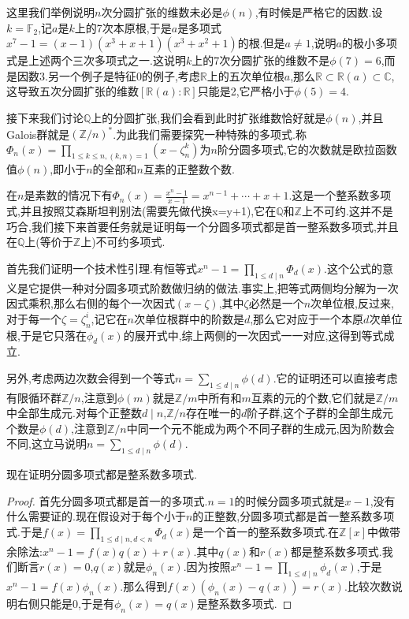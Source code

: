 这里我们举例说明$n$次分圆扩张的维数未必是$\phi(n)$,有时候是严格它的因数.设$k=\mathbb{F}_2$,记$a$是$k$上的7次本原根,于是$a$是多项式$x^7-1=(x-1)(x^3+x+1)(x^3+x^2+1)$的根.但是$a\not=1$,说明$a$的极小多项式是上述两个三次多项式之一.这说明$k$上的7次分圆扩张的维数不是$\phi(7)=6$,而是因数3.另一个例子是特征0的例子,考虑$\mathbb{R}$上的五次单位根$a$,那么$\mathbb{R}\subset\mathbb{R}(a)\subset\mathbb{C}$,这导致五次分圆扩张的维数$[\mathbb{R}(a):\mathbb{R}]$只能是2,它严格小于$\phi(5)=4$.

接下来我们讨论$\mathbb{Q}$上的分圆扩张,我们会看到此时扩张维数恰好就是$\phi(n)$,并且Galois群就是$(\mathbb{Z}/n)^*$.为此我们需要探究一种特殊的多项式.称$\Phi_n(x)=\prod_{1\le k\le n,(k,n)=1}(x-\zeta_n^k)$为$n$阶分圆多项式,它的次数就是欧拉函数值$\phi(n)$,即小于$n$的全部和$n$互素的正整数个数.

在$n$是素数的情况下有$\Phi_n(x)=\frac{x^n-1}{x-1}=x^{n-1}+\cdots+x+1$.这是一个整系数多项式,并且按照艾森斯坦判别法(需要先做代换x=y+1),它在$\mathbb{Q}$和$\mathbb{Z}$上不可约.这并不是巧合,我们接下来首要任务就是证明每一个分圆多项式都是首一整系数多项式,并且在$\mathbb{Q}$上(等价于$\mathbb{Z}$上)不可约多项式.

首先我们证明一个技术性引理.有恒等式$x^n-1=\prod_{1\le d\mid n}\Phi_d(x)$.这个公式的意义是它提供一种对分圆多项式阶数做归纳的做法.事实上,把等式两侧均分解为一次因式乘积,那么右侧的每个一次因式$(x-\zeta)$,其中$\zeta$必然是一个$n$次单位根,反过来,对于每一个$\zeta=\zeta_{n}^i$,记它在$n$次单位根群中的阶数是$d$,那么它对应于一个本原$d$次单位根,于是它只落在$\phi_d(x)$的展开式中,综上两侧的一次因式一一对应,这得到等式成立.

另外,考虑两边次数会得到一个等式$n=\sum_{1\le d\mid n}\phi(d)$.它的证明还可以直接考虑有限循环群$\mathbb{Z}/n$,注意到$\phi(m)$就是$\mathbb{Z}/m$中所有和$m$互素的元的个数,它们就是$\mathbb{Z}/m$中全部生成元.对每个正整数$d\mid n$,$\mathbb{Z}/n$存在唯一的$d$阶子群,这个子群的全部生成元个数是$\phi(d)$,注意到$\mathbb{Z}/n$中同一个元不能成为两个不同子群的生成元,因为阶数会不同,这立马说明$n=\sum_{1\le d\mid n}\phi(d)$.

现在证明分圆多项式都是整系数多项式.
\begin{proof}
	
	首先分圆多项式都是首一的多项式.$n=1$的时候分圆多项式就是$x-1$,没有什么需要证的.现在假设对于每个小于$n$的正整数,分圆多项式都是首一整系数多项式.于是$f(x)=\prod_{1\le d\mid n,d<n}\Phi_d(x)$是一个首一的整系数多项式.在$\mathbb{Z}[x]$中做带余除法:$x^n-1=f(x)q(x)+r(x)$.其中$q(x)$和$r(x)$都是整系数多项式.我们断言$r(x)=0$,$q(x)$就是$\phi_n(x)$.因为按照$x^n-1=\prod_{1\le d\mid n}\phi_d(x)$,于是$x^n-1=f(x)\phi_n(x)$.那么得到$f(x)(\phi_n(x)-q(x))=r(x)$.比较次数说明右侧只能是0,于是有$\phi_n(x)=q(x)$是整系数多项式.
\end{proof}

